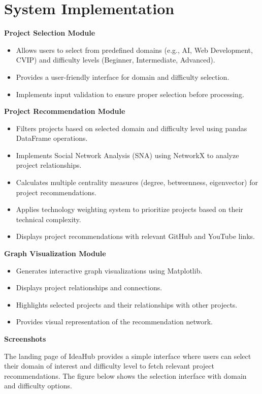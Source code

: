 \section{System Implementation}

\textbf{Project Selection Module}
\begin{itemize}
    \item Allows users to select from predefined domains (e.g., AI, Web Development, CVIP) and difficulty levels (Beginner, Intermediate, Advanced).
    \item Provides a user-friendly interface for domain and difficulty selection.
    \item Implements input validation to ensure proper selection before processing.
\end{itemize}

\textbf{Project Recommendation Module}
\begin{itemize}
    \item Filters projects based on selected domain and difficulty level using pandas DataFrame operations.
    \item Implements Social Network Analysis (SNA) using NetworkX to analyze project relationships.
    \item Calculates multiple centrality measures (degree, betweenness, eigenvector) for project recommendations.
    \item Applies technology weighting system to prioritize projects based on their technical complexity.
    \item Displays project recommendations with relevant GitHub and YouTube links.
\end{itemize}

\textbf{Graph Visualization Module}
\begin{itemize}
    \item Generates interactive graph visualizations using Matplotlib.
    \item Displays project relationships and connections.
    \item Highlights selected projects and their relationships with other projects.
    \item Provides visual representation of the recommendation network.
\end{itemize}

\textbf{Screenshots}

The landing page of IdeaHub provides a simple interface where users can select their domain of interest and difficulty level to fetch relevant project recommendations. The figure below shows the selection interface with domain and difficulty options.

